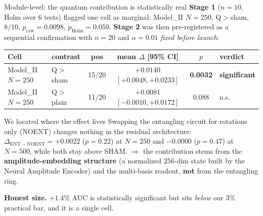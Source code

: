 \documentclass[aspectratio=169,10pt]{beamer}
\newcommand{\gd}[1]{\textcolor{good}{#1}}
\newcommand{\bd}[1]{\textcolor{bad}{#1}}
\newcommand{\qq}[1]{\textcolor{q}{#1}}
\begin{document}
\begin{frame}{Module-level: the quantum contribution is statistically real}
\scriptsize
\textbf{Stage 1} ($n{=}10$, Holm over 6 tests) flagged one cell as marginal:
Model\_II $N{=}250$, Q$>$sham, $8/10$, $p_{\mathrm{raw}}{=}0.0098$,
$p_{\mathrm{Holm}}{=}0.059$. \;
\textbf{Stage 2} was then pre-registered as a sequential confirmation with
$n{=}20$ and $\alpha{=}0.01$ \emph{fixed before launch}:
\smallskip

\begin{tabular}{@{}llcccl@{}}
\toprule
Cell & contrast & pos & mean $\Delta$ [95\% CI] & $p$ & verdict \\
\midrule
Model\_II $N{=}250$ & Q$>$sham  & 15/20 & $+0.0140$ $[+0.0048,+0.0233]$ &
  \gd{\textbf{0.0032}} & \gd{\textbf{significant}} \\
Model\_II $N{=}250$ & Q$>$plain & 11/20 & $+0.0081$ $[-0.0010,+0.0172]$ &
  0.088 & \bd{n.s.} \\
\bottomrule
\end{tabular}
\normalsize
\smallskip

\footnotesize
\begin{block}{We located where the effect lives}
Swapping the entangling circuit for rotations only (NOENT) changes nothing in the
residual architecture: $\Delta_{\mathrm{ENT}-\mathrm{NOENT}}={+}0.0022$ ($p{=}0.22$) at
$N{=}250$ and $-0.0000$ ($p{=}0.47$) at $N{=}500$, while both stay above SHAM.
$\Rightarrow$ the contribution stems from the \qq{\textbf{amplitude-embedding
structure}} (a normalized $256$-dim state built by the Neural Amplitude Encoder)
and the multi-basis readout, \textbf{not} from the entangling ring.
\end{block}

\textbf{Honest size.} $+1.4\%$ AUC is statistically significant but sits
\emph{below} our $3\%$ practical bar, and it is a single cell.
\end{frame}
\end{document}
